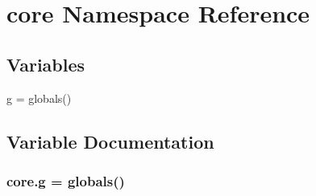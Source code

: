 \hypertarget{namespacecore}{}\section{core Namespace Reference}
\label{namespacecore}
\subsection*{Variables}
\begin{DoxyCompactItemize}
\item 
\hyperlink{namespacecore_af4d24427c979ce2ed3601d7a6532e433}{g} = globals()
\end{DoxyCompactItemize}


\subsection{Variable Documentation}
\subsubsection[{\texorpdfstring{g}{g}}]{\setlength{\rightskip}{0pt plus 5cm}core.\+g = globals()}\hypertarget{namespacecore_af4d24427c979ce2ed3601d7a6532e433}{}\label{namespacecore_af4d24427c979ce2ed3601d7a6532e433}
